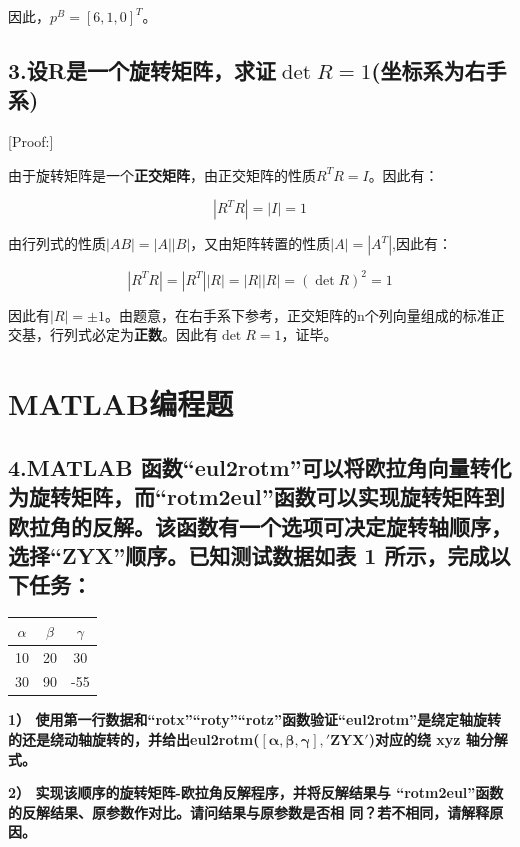 \documentclass{ctexart}
\begin{document}
因此，$p^B = [6,1,0]^T$。

\subsection*{3.设R是一个旋转矩阵，求证$\det{R}=1$(坐标系为右手系)}

[Proof:]\par

由于旋转矩阵是一个\textbf{正交矩阵}，由正交矩阵的性质$R^TR=I$。因此有：

\begin{equation}
	|R^TR| = |I| = 1
\end{equation}

由行列式的性质$|AB| = |A||B|$，又由矩阵转置的性质$|A|=|A^T|$,因此有：

\begin{equation}
	|R^TR| = |R^T||R| = |R||R| = (\det{R})^2 = 1
\end{equation}

因此有$|R| = \pm 1$。由题意，在右手系下参考，正交矩阵的n个列向量组成的标准正交基，行列式必定为\textbf{正数}。因此有$\det{R}=1$，证毕。

\section*{MATLAB编程题}

\subsection*{4.MATLAB 函数“eul2rotm”可以将欧拉角向量转化为旋转矩阵，而“rotm2eul”函数可以实现旋转矩阵到欧拉角的反解。该函数有一个选项可决定旋转轴顺序，选择“ZYX”顺序。已知测试数据如表 1 所示，完成以下任务：}
\begin{table}[h]
	\centering
	\begin{tabular}{ccc}
	\hline
	$\alpha$ & $\beta$ & $\gamma$ \\ \hline
	10       & 20      & 30       \\ 
	30       & 90      & -55      \\ \hline
	\end{tabular}
	\end{table}
\textbf{1）	使用第一行数据和“rotx”“roty”“rotz”函数验证“eul2rotm”是绕定轴旋转的还是绕动轴旋转的，并给出eul2rotm($\mathbf{[\alpha,\beta,\gamma],'ZYX'}$)对应的绕 xyz 轴分解式。}

\textbf{2）	实现该顺序的旋转矩阵-欧拉角反解程序，并将反解结果与 “rotm2eul”函数的反解结果、原参数作对比。请问结果与原参数是否相 同？若不相同，请解释原因。
}
\end{document}
